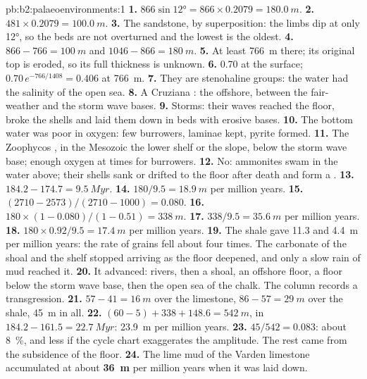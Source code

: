\begin{solution}{pb:b2:palaeoenvironments:1}
\textbf{1.} $866 \sin \ang{12} = 866 \times 0.2079 = \qty{180.0}{m}$.
\textbf{2.} $481 \times 0.2079 = \qty{100.0}{m}$.
\textbf{3.} The sandstone, by superposition: the limbs dip at only \ang{12}, so the beds are not
overturned and the lowest is the oldest.
\textbf{4.} $866 - 766 = \qty{100}{m}$ and $1046 - 866 = \qty{180}{m}$.
\textbf{5.} At least \qty{766}{m} there; its original top is eroded, so its full thickness is
unknown.
\textbf{6.} 0.70 at the surface; $0.70\,e^{-766/1408} = 0.406$ at \qty{766}{m}.
\textbf{7.} They are stenohaline groups: the water had the salinity of the open sea.
\textbf{8.} A Cruziana : the offshore, between the fair-weather and the storm wave
bases.
\textbf{9.} Storms: their waves reached the floor, broke the shells and laid them down in beds
with erosive bases.
\textbf{10.} The bottom water was poor in oxygen: few burrowers, laminae kept, pyrite formed.
\textbf{11.} The Zoophycos , in the Mesozoic the lower shelf or the slope, below the
storm wave base; enough oxygen at times for burrowers.
\textbf{12.} No: ammonites swam in the water above; their shells sank or drifted to the floor
after death and form a .
\textbf{13.} $184.2 - 174.7 = \qty{9.5}{Myr}$.
\textbf{14.} $180/9.5 = \qty{18.9}{m}$ per million years.
\textbf{15.} $(2710 - 2573)/(2710 - 1000) = 0.080$.
\textbf{16.} $180 \times (1 - 0.080)/(1 - 0.51) = \qty{338}{m}$.
\textbf{17.} $338/9.5 = \qty{35.6}{m}$ per million years.
\textbf{18.} $180 \times 0.92/9.5 = \qty{17.4}{m}$ per million years.
\textbf{19.} The shale gave 11.3 and \qty{4.4}{m} per million years: the rate of grains fell
about four times. The carbonate of the shoal and the shelf stopped arriving as the floor
deepened, and only a slow rain of mud reached it.
\textbf{20.} It advanced: rivers, then a shoal, an offshore floor, a floor below the storm wave
base, then the open sea of the chalk. The column records a transgression.
\textbf{21.} $57 - 41 = \qty{16}{m}$ over the limestone, $86 - 57 = \qty{29}{m}$ over the shale,
\qty{45}{m} in all.
\textbf{22.} $(60 - 5) + 338 + 148.6 = \qty{542}{m}$, in $184.2 - 161.5 = \qty{22.7}{Myr}$:
\qty{23.9}{m} per million years.
\textbf{23.} $45/542 = 0.083$: about \qty{8}{\percent}, and less if the cycle chart exaggerates
the amplitude. The rest came from the subsidence of the floor.
\textbf{24.} The lime mud of the Varden limestone accumulated at about
\textbf{\qty[text-series-to-math=true]{36}{m}} per million years when it was laid down.
\end{solution}
